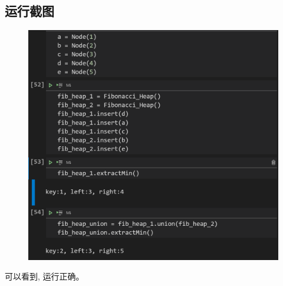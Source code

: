\documentclass{ctexart}[UTF8]
\begin{document}
    \subsection{运行截图}
    \begin{figure}[H]
        \centering
        \includegraphics[width=12cm]{../Resources/11_1.png}
    \end{figure}
    可以看到, 运行正确。
\end{document}
